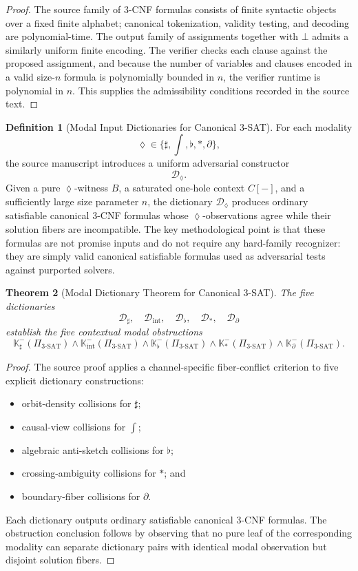 \documentclass[11pt]{article}
\newtheorem{theorem}{Theorem}[section]
\theoremstyle{definition}
\newtheorem{definition}[theorem]{Definition}
\theoremstyle{remark}
\begin{document}
\begin{proof}
The source family of $3$-CNF formulas consists of finite syntactic objects over a fixed finite alphabet; canonical tokenization, validity testing, and decoding are polynomial-time. The output family of assignments together with $\bot$ admits a similarly uniform finite encoding. The verifier checks each clause against the proposed assignment, and because the number of variables and clauses encoded in a valid size-$n$ formula is polynomially bounded in $n$, the verifier runtime is polynomial in $n$. This supplies the admissibility conditions recorded in the source text.
\end{proof}

\begin{definition}[Modal Input Dictionaries for Canonical 3-SAT]\label{def-modal-input-dictionaries-3sat}
For each modality
\[
\lozenge \in \{\sharp, \int, \flat, \ast, \partial\},
\]
the source manuscript introduces a uniform adversarial constructor
\[
\mathcal D_\lozenge.
\]
Given a pure $\lozenge$-witness $B$, a saturated one-hole context $C[-]$, and a sufficiently large size parameter $n$, the dictionary $\mathcal D_\lozenge$ produces ordinary satisfiable canonical $3$-CNF formulas whose $\lozenge$-observations agree while their solution fibers are incompatible. The key methodological point is that these formulas are not promise inputs and do not require any hard-family recognizer: they are simply valid canonical satisfiable formulas used as adversarial tests against purported solvers.
\end{definition}

\begin{theorem}[Modal Dictionary Theorem for Canonical 3-SAT]\label{thm-modal-dictionary-3sat}
The five dictionaries
\[
\mathcal D_\sharp,
\quad
\mathcal D_{\mathrm{int}},
\quad
\mathcal D_\flat,
\quad
\mathcal D_\ast,
\quad
\mathcal D_\partial
\]
establish the five contextual modal obstructions
\[
\mathbb K_\sharp^-(\Pi_{3\text{-SAT}})
\wedge
\mathbb K_{\mathrm{int}}^-(\Pi_{3\text{-SAT}})
\wedge
\mathbb K_\flat^-(\Pi_{3\text{-SAT}})
\wedge
\mathbb K_\ast^-(\Pi_{3\text{-SAT}})
\wedge
\mathbb K_\partial^-(\Pi_{3\text{-SAT}}).
\]
\end{theorem}

\begin{proof}
The source proof applies a channel-specific fiber-conflict criterion to five explicit dictionary constructions:
\begin{itemize}
\item orbit-density collisions for $\sharp$;
\item causal-view collisions for $\int$;
\item algebraic anti-sketch collisions for $\flat$;
\item crossing-ambiguity collisions for $\ast$; and
\item boundary-fiber collisions for $\partial$.
\end{itemize}
Each dictionary outputs ordinary satisfiable canonical $3$-CNF formulas. The obstruction conclusion follows by observing that no pure leaf of the corresponding modality can separate dictionary pairs with identical modal observation but disjoint solution fibers.
\end{proof}
\end{document}
